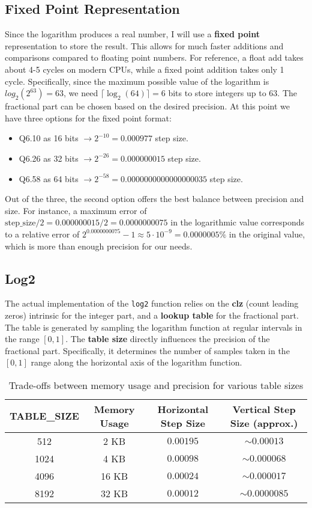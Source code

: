 \documentclass[11pt]{article}
\begin{document}
\subsection{Fixed Point Representation}
Since the logarithm produces a real number, I will use a \textbf{fixed point} representation to store the result. This allows for much faster additions and comparisons compared to floating point numbers. For reference, a float add takes about 4-5 cycles on modern CPUs\textsuperscript{\cite{agner2024}}, while a fixed point addition takes only 1 cycle. Specifically, since the maximum possible value of the logarithm is $log_2(2^{63}) = 63$, we need $\lceil \log_2(64) \rceil = 6$ bits to store integers up to 63. The fractional part can be chosen based on the desired precision. At this point we have three options for the fixed point format:
\begin{itemize}
    \item Q6.10 as 16 bits $\rightarrow 2^{-10} = 0.000977$ step size.
    \item Q6.26 as 32 bits $\rightarrow 2^{-26} = 0.000000015$ step size.
    \item Q6.58 as 64 bits $\rightarrow 2^{-58} = 0.0000000000000000035$ step size.
\end{itemize}
Out of the three, the second option offers the best balance between precision and size. For instance, a maximum error of $\text{step\_size} / 2 = 0.000000015 / 2 = 0.0000000075$ in the logarithmic value corresponds to a relative error of $2^{0.0000000075} - 1 \approx 5 \cdot 10^{-9} = 0.0000005\%$ in the original value, which is more than enough precision for our needs.

\subsection{Log2}
The actual implementation of the \texttt{log2} function relies on the \textbf{clz} (count leading zeros) intrinsic for the integer part, and a \textbf{lookup table} for the fractional part. The table is generated by sampling the logarithm function at regular intervals in the range $[0, 1]$.
The \textbf{table size} directly influences the precision of the fractional part. Specifically, it determines the number of samples taken in the $[0, 1]$ range along the horizontal axis of the logarithm function.
\begin{table}[h]
\centering
\begin{tabular}{|c|c|c|c|}
\hline
\textbf{TABLE\_SIZE} & \textbf{Memory Usage} & \textbf{Horizontal Step Size} & \textbf{Vertical Step Size (approx.)} \\
\hline
512     & 2 KB    & $0.00195$   & $\sim0.00013$ \\
1024    & 4 KB    & $0.00098$   & $\sim0.000068$ \\
4096    & 16 KB   & $0.00024$   & $\sim0.000017$ \\
8192    & 32 KB   & $0.00012$   & $\sim0.0000085$ \\
\hline
\end{tabular}
\caption{Trade-offs between memory usage and precision for various table sizes}
\end{table}
\end{document}
